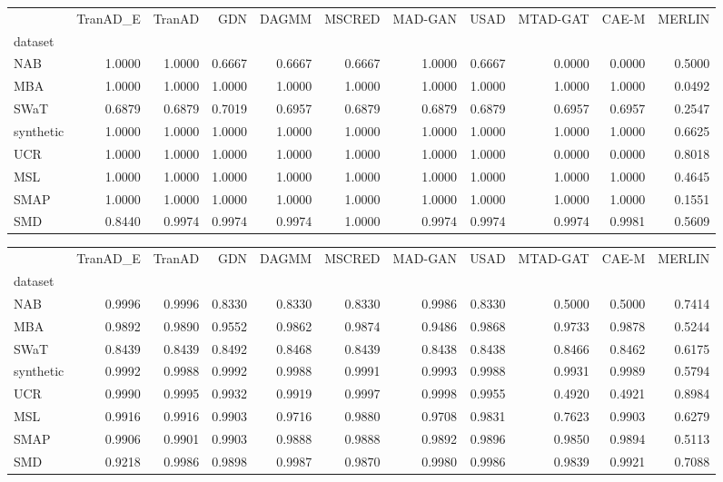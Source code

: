 \begin{tabular}{lrrrrrrrrrr}
\toprule
 & TranAD_E & TranAD & GDN & DAGMM & MSCRED & MAD-GAN & USAD & MTAD-GAT & CAE-M & MERLIN \\
dataset &  &  &  &  &  &  &  &  &  &  \\
\midrule
NAB & 1.0000 & 1.0000 & 0.6667 & 0.6667 & 0.6667 & 1.0000 & 0.6667 & 0.0000 & 0.0000 & 0.5000 \\
MBA & 1.0000 & 1.0000 & 1.0000 & 1.0000 & 1.0000 & 1.0000 & 1.0000 & 1.0000 & 1.0000 & 0.0492 \\
SWaT & 0.6879 & 0.6879 & 0.7019 & 0.6957 & 0.6879 & 0.6879 & 0.6879 & 0.6957 & 0.6957 & 0.2547 \\
synthetic & 1.0000 & 1.0000 & 1.0000 & 1.0000 & 1.0000 & 1.0000 & 1.0000 & 1.0000 & 1.0000 & 0.6625 \\
UCR & 1.0000 & 1.0000 & 1.0000 & 1.0000 & 1.0000 & 1.0000 & 1.0000 & 0.0000 & 0.0000 & 0.8018 \\
MSL & 1.0000 & 1.0000 & 1.0000 & 1.0000 & 1.0000 & 1.0000 & 1.0000 & 1.0000 & 1.0000 & 0.4645 \\
SMAP & 1.0000 & 1.0000 & 1.0000 & 1.0000 & 1.0000 & 1.0000 & 1.0000 & 1.0000 & 1.0000 & 0.1551 \\
SMD & 0.8440 & 0.9974 & 0.9974 & 0.9974 & 1.0000 & 0.9974 & 0.9974 & 0.9974 & 0.9981 & 0.5609 \\
\bottomrule
\end{tabular}

\begin{tabular}{lrrrrrrrrrr}
\toprule
 & TranAD_E & TranAD & GDN & DAGMM & MSCRED & MAD-GAN & USAD & MTAD-GAT & CAE-M & MERLIN \\
dataset &  &  &  &  &  &  &  &  &  &  \\
\midrule
NAB & 0.9996 & 0.9996 & 0.8330 & 0.8330 & 0.8330 & 0.9986 & 0.8330 & 0.5000 & 0.5000 & 0.7414 \\
MBA & 0.9892 & 0.9890 & 0.9552 & 0.9862 & 0.9874 & 0.9486 & 0.9868 & 0.9733 & 0.9878 & 0.5244 \\
SWaT & 0.8439 & 0.8439 & 0.8492 & 0.8468 & 0.8439 & 0.8438 & 0.8438 & 0.8466 & 0.8462 & 0.6175 \\
synthetic & 0.9992 & 0.9988 & 0.9992 & 0.9988 & 0.9991 & 0.9993 & 0.9988 & 0.9931 & 0.9989 & 0.5794 \\
UCR & 0.9990 & 0.9995 & 0.9932 & 0.9919 & 0.9997 & 0.9998 & 0.9955 & 0.4920 & 0.4921 & 0.8984 \\
MSL & 0.9916 & 0.9916 & 0.9903 & 0.9716 & 0.9880 & 0.9708 & 0.9831 & 0.7623 & 0.9903 & 0.6279 \\
SMAP & 0.9906 & 0.9901 & 0.9903 & 0.9888 & 0.9888 & 0.9892 & 0.9896 & 0.9850 & 0.9894 & 0.5113 \\
SMD & 0.9218 & 0.9986 & 0.9898 & 0.9987 & 0.9870 & 0.9980 & 0.9986 & 0.9839 & 0.9921 & 0.7088 \\
\bottomrule
\end{tabular}

